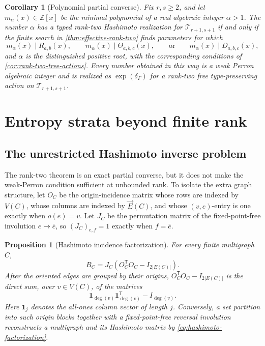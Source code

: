 \documentclass[11pt]{amsart}
\theoremstyle{plain}
\newtheorem{proposition}[theorem]{Proposition}
\newtheorem{corollary}[theorem]{Corollary}
\theoremstyle{definition}
\theoremstyle{remark}
\newcommand{\T}{\mathcal T}
\newcommand{\ZZ}{\mathbb Z}
\begin{document}
\begin{corollary}[Polynomial partial converse]\label{cor:rank-two-converse}
Fix \(r,s\geq2\), and let \(m_\alpha(x)\in\ZZ[x]\) be the minimal
polynomial of a real algebraic integer \(\alpha>1\).  The number \(\alpha\)
has a typed rank-two Hashimoto realization for \(\T_{r+1,s+1}\) if and only
if the finite search in
\cref{thm:effective-rank-two} finds parameters for which
\[
  m_\alpha(x)\mid R_{a,b}(x),\qquad
  m_\alpha(x)\mid\Theta_{a,b,c}(x),\qquad\text{or}\qquad
  m_\alpha(x)\mid D_{a,b,c}(x),
\]
and \(\alpha\) is the distinguished positive root, with the corresponding
conditions of \cref{cor:rank-two-tree-actions}.  Every number obtained in
this way is a weak Perron algebraic integer and is realized as
\(\exp(\delta_\Gamma)\) for a rank-two free type-preserving action on
\(\T_{r+1,s+1}\).
\end{corollary}

\section{Entropy strata beyond finite rank}
\label{sec:structural-problems}

\subsection{The unrestricted Hashimoto inverse problem}

The rank-two theorem is an exact partial converse, but it does not make the
weak-Perron condition sufficient at unbounded rank.  To isolate the extra
graph structure, let \(O_C\) be the origin-incidence matrix whose rows are
indexed by \(V(C)\), whose columns are indexed by \(\vec E(C)\), and whose
\((v,e)\)-entry is one exactly when \(o(e)=v\).  Let \(J_C\) be the
permutation matrix of the fixed-point-free involution \(e\mapsto\bar e\), so
\((J_C)_{e,f}=1\) exactly when \(f=\bar e\).

\begin{proposition}[Hashimoto incidence factorization]
\label{prop:hashimoto-factorization}
For every finite multigraph \(C\),
\begin{equation}\label{eq:hashimoto-factorization}
  B_C=J_C(O_C^{\mathsf T}O_C-I_{2|E(C)|}).
\end{equation}
After the oriented edges are grouped by their origins,
\(O_C^{\mathsf T}O_C-I_{2|E(C)|}\) is the direct sum, over
\(v\in V(C)\), of the
matrices
\[
  \mathbf1_{\deg(v)}\mathbf1_{\deg(v)}^{\mathsf T}-I_{\deg(v)}.
\]
Here \(\mathbf1_j\) denotes the all-ones column vector of length \(j\).
Conversely, a set partition into such origin blocks together with a
fixed-point-free reversal involution reconstructs a multigraph and its
Hashimoto matrix by \eqref{eq:hashimoto-factorization}.
\end{proposition}
\end{document}
